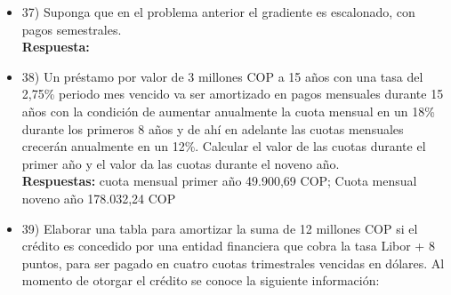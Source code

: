 \begin{itemize}
 \item  37) Suponga que en el problema anterior el gradiente es escalonado, con pagos semestrales.\\

       \textbf{ Respuesta:}
       \begin{center}
       \end{center}
       \medskip

 \item 38)  Un préstamo por valor de 3 millones COP a 15 años con una tasa del 2,75\% periodo mes vencido va ser amortizado en pagos mensuales durante 15 años con la condición de aumentar anualmente la cuota mensual en un 18\% durante los primeros 8 años y de ahí en adelante las cuotas mensuales crecerán anualmente en un 12\%. Calcular el valor de las cuotas durante el primer año y el valor da las cuotas durante el noveno año. \\
       \textbf{Respuestas:} cuota mensual primer año 49.900,69 COP;
       Cuota mensual noveno año 178.032,24 COP
       \medskip

 \item 39)  Elaborar una tabla para amortizar la suma de 12 millones COP si el crédito es concedido por una entidad financiera que cobra la tasa Libor + 8 puntos, para ser pagado en cuatro cuotas trimestrales vencidas en dólares. Al momento de otorgar el crédito se conoce la siguiente información: \\


\end{itemize}
